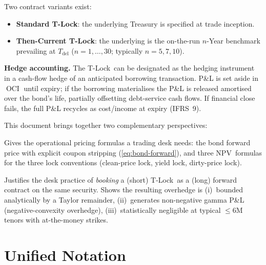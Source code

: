 \documentclass[11pt]{article}
\theoremstyle{definition}
\newcommand{\Tlock}{T-Lock}
\newcommand{\NPV}{\ensuremath{\mathrm{NPV}}}
\newcommand{\Tdel}{T_{\mathrm{del}}}
\DeclareMathOperator{\OCI}{OCI}
\begin{document}
Two contract variants exist:
\begin{itemize}[leftmargin=1.4em,itemsep=2pt,topsep=2pt]
\item \textbf{Standard \Tlock}: the underlying Treasury is specified at trade
      inception.
\item \textbf{Then-Current \Tlock}: the underlying is the on-the-run $n$-Year
      benchmark prevailing at $\Tdel$ ($n = 1,\dots,30$; typically $n=5,7,10$).
\end{itemize}

\textbf{Hedge accounting.} The \Tlock\ can be designated as the hedging
instrument in a cash-flow hedge of an anticipated borrowing transaction.
P\&L is set aside in $\OCI$ until expiry; if the borrowing materialises
the P\&L is released amortised over the bond's life, partially offsetting
debt-service cash flows. If financial close fails, the full P\&L recycles
as cost/income at expiry (IFRS~9).

This document brings together two complementary perspectives:

\begin{description}[leftmargin=1.6em,itemsep=2pt]
\item[Part I --- Practitioner Pricing Model (anonymous note).]
Gives the operational pricing formulas a trading desk needs: the bond
forward price with explicit coupon stripping (\cref{eq:bond-forward}),
and three \NPV\ formulas for the three lock conventions
(clean-price lock, yield lock, dirty-price lock).
\item[Part II --- Hedging and Convexity Analysis (Pucci 2019).]
Justifies the desk practice of \emph{booking} a (short) \Tlock\ as a (long)
forward contract on the same security. Shows the resulting overhedge
is (i)~bounded analytically by a Taylor remainder, (ii)~generates
non-negative gamma P\&L (negative-convexity overhedge), (iii)~statistically
negligible at typical $\le 6$M tenors with at-the-money strikes.
\end{description}


\section{Unified Notation}\label{sec:notation}
\end{document}
